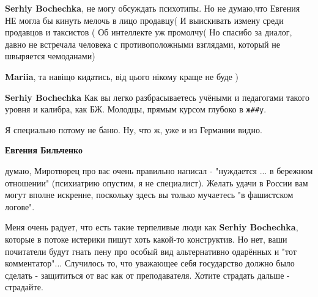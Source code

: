 \begin{itemize}
\begin{itemize}
\textbf{Serhiy Bochechka}, не могу обсуждать психотипы. Но не думаю,что Евгения НЕ могла бы кинуть мелочь в лицо продавцу( И выискивать измену среди продавцов и таксистов ( Об интеллекте уж промолчу(
Но спасибо за диалог, давно не встречала человека с противоположными взглядами, который не швыряется чемоданами)

 
\textbf{Mariia}, та навіщо кидатись, від цього нікому краще не буде )

 
\textbf{Serhiy Bochechka} Как вы легко разбрасываетесь учёными и педагогами такого уровня и калибра, как БЖ.
Молодцы, прямым курсом глубоко в \verb|ж##у|.

 
Я специально потому не баню. Ну, что ж, уже и из Германии видно.

 
\textbf{Евгения Бильченко} 

думаю, Миротворец про вас очень правильно написал - "нуждается ... в бережном
отношении" (психиатрию опустим, я не специалист). Желать удачи в России вам
могут вполне искренне, поскольку здесь вы только мучаетесь "в фашистском
логове". 

Меня очень радует, что есть такие терпеливые люди как \textbf{Serhiy
Bochechka}, которые в потоке истерики пишут хоть какой-то конструктив. Но нет,
ваши почитатели будут гнать пену про особый вид альтернативно одарённых и "тот
комментатор"... Случилось то, что уважающее себя государство должно было
сделать - защититься от вас как от преподавателя. Хотите страдать дальше -
страдайте. 


\end{itemize}
\end{itemize}
